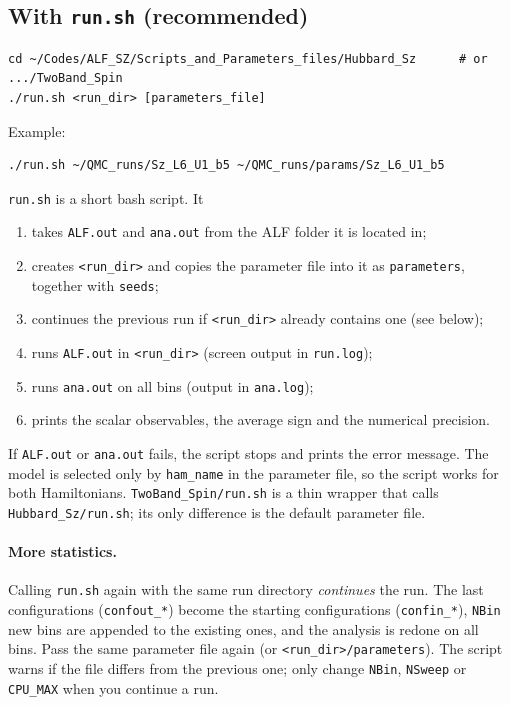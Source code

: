 \documentclass[11pt,a4paper]{article}
\newcommand{\f}[1]{\texttt{#1}}          %
\begin{document}
\subsection{With \texorpdfstring{\texttt{run.sh}}{run.sh} (recommended)}
\label{sec:runsh}
\begin{lstlisting}
cd ~/Codes/ALF_SZ/Scripts_and_Parameters_files/Hubbard_Sz      # or .../TwoBand_Spin
./run.sh <run_dir> [parameters_file]
\end{lstlisting}
Example:
\begin{lstlisting}
./run.sh ~/QMC_runs/Sz_L6_U1_b5 ~/QMC_runs/params/Sz_L6_U1_b5
\end{lstlisting}
\f{run.sh} is a short bash script. It
\begin{enumerate}
  \item takes \f{ALF.out} and \f{ana.out} from the ALF folder it is located in;
  \item creates \f{<run\_dir>} and copies the parameter file into it as \f{parameters},
        together with \f{seeds};
  \item continues the previous run if \f{<run\_dir>} already contains one (see below);
  \item runs \f{ALF.out} in \f{<run\_dir>} (screen output in \f{run.log});
  \item runs \f{ana.out} on all bins (output in \f{ana.log});
  \item prints the scalar observables, the average sign and the numerical precision.
\end{enumerate}
If \f{ALF.out} or \f{ana.out} fails, the script stops and prints the error message.
The model is selected only by \f{ham\_name} in the parameter file, so the script works for
both Hamiltonians. \f{TwoBand\_Spin/run.sh} is a thin wrapper that calls
\f{Hubbard\_Sz/run.sh}; its only difference is the default parameter file.

\paragraph{More statistics.}
Calling \f{run.sh} again with the same run directory \emph{continues} the run. The last
configurations (\f{confout\_*}) become the starting configurations (\f{confin\_*}), \f{NBin}
new bins are appended to the existing ones, and the analysis is redone on all bins. Pass the
same parameter file again (or \f{<run\_dir>/parameters}). The script warns if the file
differs from the previous one; only change \f{NBin}, \f{NSweep} or \f{CPU\_MAX} when you
continue a run.
\end{document}
